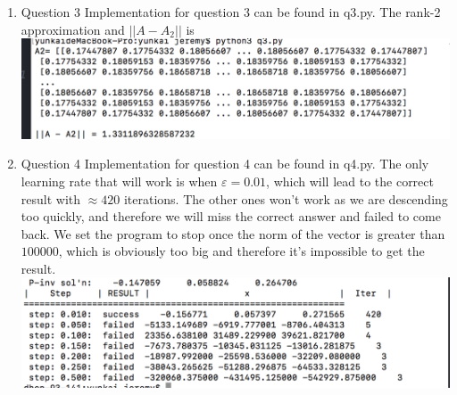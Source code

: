 \documentclass[11pt]{article}
\begin{document}
\begin{enumerate}
\item Question 3\newline
Implementation for question 3 can be found in q3.py. The rank-2 approximation and $||A-A_2||$ is\\
\includegraphics{q3_result}

\item Question 4\newline
Implementation for question 4 can be found in q4.py. The only learning rate that will work is when $ε = 0.01$, which will lead to the correct result with $\approx 420$ iterations. The other ones won't work as we are descending too quickly, and therefore we will miss the correct answer and failed to come back. We set the program to stop once the norm of the vector is greater than $100000$, which is obviously too big and therefore it's impossible to get the result.
\includegraphics{q4_result}


\end{enumerate}
\end{document}
